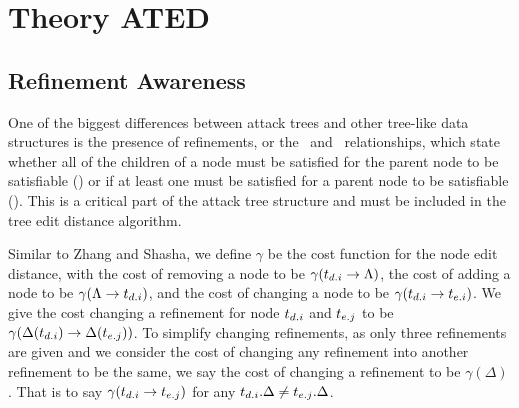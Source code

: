 \section{Theory ATED}

\subsection{Refinement Awareness}
\label{sec:refinement-awareness}

One of the biggest differences between attack trees and other tree-like data structures is the presence of refinements, or the \AND\ and \OR\ relationships, which state whether all of the children of a node must be satisfied for the parent node to be satisfiable (\AND) or if at least one must be satisfied for a parent node to be satisfiable (\OR). This is a critical part of the attack tree structure and must be included in the tree edit distance algorithm.




\begin{definition}\label{def:cost-function}
    Similar to Zhang and Shasha, we define $\gamma$ be the cost function for the node edit distance, with the cost of removing a node to be $\gamma(t_{{d}.{i}} \rightarrow {\Lambda})$, the cost of adding a node to be $\gamma({\Lambda}\rightarrow t_{{d}.{i}})$, and the cost of changing a node to be $\gamma(t_{{d}.{i}} \rightarrow t_{{e}.{i}})$. We give the cost changing a refinement for node  $t_{{d}.{i}}$ and $t_{{e}.{j}}$ to be $\gamma(\Delta(t_{{d}.{i}}) \rightarrow \Delta(t_{{e}.{j}}))$. To simplify changing refinements, as only three refinements are given and we consider the cost of changing any refinement into another refinement to be the same, we say the cost of changing a refinement to be $\gamma(\Delta)$. That is to say $\gamma(t_{{d}.{i}} \rightarrow t_{{e}.{j}})$ for any $t_{{d}.{i}}.\Delta \ne t_{{e}.{j}}.\Delta$.
\end{definition}



